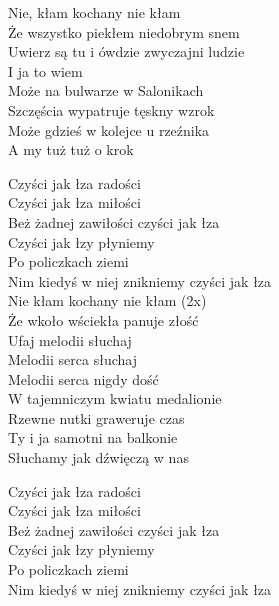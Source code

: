 \begin{text}
    \ifchorded{\hfill\break}
    Nie, kłam kochany nie kłam\\
    Że wszystko piekłem niedobrym snem\\
    Uwierz są tu i ówdzie zwyczajni ludzie\\
    I ja to wiem\\
    Może na bulwarze w Salonikach\\
    Szczęścia wypatruje tęskny wzrok\\
    Może gdzieś w kolejce u rzeźnika\\
    A my tuż tuż o krok

    \vin Czyści jak łza radości\\
    \vin Czyści jak łza miłości\\
    \vin Beż żadnej zawiłości czyści jak łza\\
    \vin Czyści jak łzy płyniemy\\
    \vin Po policzkach ziemi\\
    \vin Nim kiedyś w niej znikniemy czyści jak łza\\

    Nie kłam kochany nie kłam (2x)\\
    Że wkoło wściekła panuje złość\\
    Ufaj melodii słuchaj\\
    Melodii serca słuchaj\\
    Melodii serca nigdy dość\\
    W tajemniczym kwiatu medalionie\\
    Rzewne nutki graweruje czas\\
    Ty i ja samotni na balkonie\\
    Słuchamy jak dźwięczą w nas

    \vin Czyści jak łza radości\\
    \vin Czyści jak łza miłości\\
    \vin Beż żadnej zawiłości czyści jak łza\\
    \vin Czyści jak łzy płyniemy\\
    \vin Po policzkach ziemi\\
    \vin Nim kiedyś w niej znikniemy czyści jak łza

\end{text}
